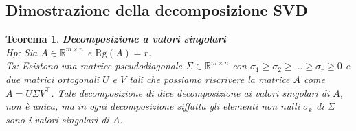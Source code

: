 \documentclass[11pt]{article}
\newtheorem{theorem}{Teorema}
\newcommand{\R}{\mathbb{R}}
\begin{document}
\subsection{Dimostrazione della decomposizione SVD }
\begin{theorem}\label{svd}
\textbf{Decomposizione a valori singolari}\\
\textit{Hp:} Sia $A \in \R^{m \times n}$ e $\text{Rg}(A)=r$. \\
\textit{Ts:} Esistono una matrice pseudodiagonale $\Sigma \in \R^{m \times n}$ con $\sigma_1 \geq \sigma_2 \geq \dots \geq \sigma_r \geq 0$ e due matrici ortogonali $U$ e $V$ tali che possiamo riscrivere la matrice $A$ come $A=U\Sigma V^\top$. Tale decomposizione di dice decomposizione ai valori singolari di $A$, non è unica, ma in ogni decomposizione siffatta gli elementi non nulli $\sigma_k$ di $\Sigma$ sono i valori singolari di $A$. 
\end{theorem}
\end{document}
